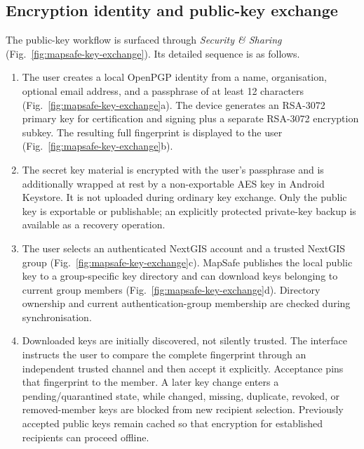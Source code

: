 \subsection{Encryption identity and public-key exchange}
\label{subsec:mapsafe-key-results}

The public-key workflow is surfaced through \emph{Security \& Sharing}
(Fig.~\ref{fig:mapsafe-key-exchange}).  Its detailed sequence is as follows.

\begin{enumerate}
  \item The user creates a local OpenPGP identity from a name, organisation,
  optional email address, and a passphrase of at least 12 characters
  (Fig.~\ref{fig:mapsafe-key-exchange}a).  The device generates an RSA-3072
  primary key for certification and signing plus a separate RSA-3072 encryption
  subkey.  The resulting full fingerprint is displayed to the user
  (Fig.~\ref{fig:mapsafe-key-exchange}b).

  \item The secret key material is encrypted with the user's passphrase and is
  additionally wrapped at rest by a non-exportable AES key in Android Keystore.
  It is not uploaded during ordinary key exchange.  Only the public key is
  exportable or publishable; an explicitly protected private-key backup is
  available as a recovery operation.

  \item The user selects an authenticated NextGIS account and a trusted NextGIS
  group (Fig.~\ref{fig:mapsafe-key-exchange}c).  MapSafe publishes the local
  public key to a group-specific key directory and can download keys belonging
  to current group members (Fig.~\ref{fig:mapsafe-key-exchange}d).  Directory
  ownership and current authentication-group membership are checked during
  synchronisation.

  \item Downloaded keys are initially discovered, not silently trusted.  The
  interface instructs the user to compare the complete fingerprint through an
  independent trusted channel and then accept it explicitly.  Acceptance pins
  that fingerprint to the member.  A later key change enters a pending/quarantined
  state, while changed, missing, duplicate, revoked, or removed-member keys are
  blocked from new recipient selection.  Previously accepted public keys remain
  cached so that encryption for established recipients can proceed offline.
\end{enumerate}


